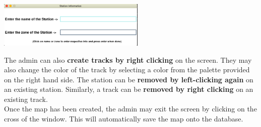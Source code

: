 \documentclass[fontsize=11pt]{article}
\begin{document}
    \begin{center}
        \includegraphics[width = 7cm]{station info.png}\\
    \end{center}
    The admin can also \textbf{create tracks by right clicking} on the screen. They may also change the color of the track by selecting a color from the palette provided on the right hand side. The station can be \textbf{removed by left-clicking again} on an existing station. Similarly, a track can be \textbf{removed by right clicking} on an existing track.\\
    Once the map has been created, the admin may exit the screen by clicking on the cross of the window. This will automatically save the map onto the database.
\end{document}

